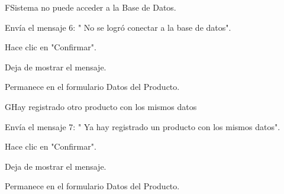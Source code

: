 \begin{UCtrayectoriaA}{F}{Sistema no puede acceder a la Base de Datos.}
	
	\UCpaso[\UCsist] Envía el mensaje 6: " No se logró conectar a la base de datos".
	
	\UCpaso[\UCactor] Hace clic en "Confirmar".

	\UCpaso[\UCsist] Deja de mostrar el mensaje.

	\UCpaso[] Permanece en el formulario Datos del Producto.

\end{UCtrayectoriaA}
\begin{UCtrayectoriaA}{G}{Hay registrado otro producto con los mismos datos}
	
	\UCpaso[\UCsist] Envía el mensaje 7: " Ya hay registrado un producto con los mismos datos".
	
	\UCpaso[\UCactor] Hace clic en "Confirmar".

	\UCpaso[\UCsist] Deja de mostrar el mensaje.

	\UCpaso[] Permanece en el formulario Datos del Producto.

\end{UCtrayectoriaA}

